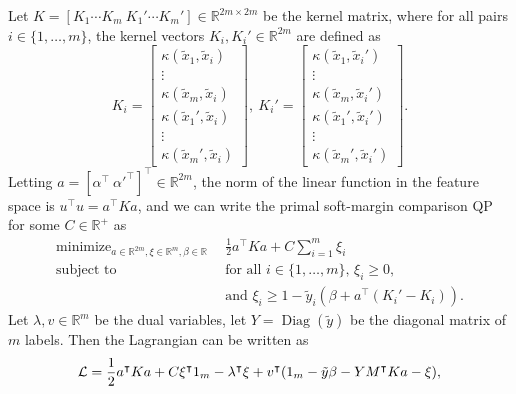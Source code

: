 \documentclass{article}
\newcommand{\RR}{\mathbb R}
\DeclareMathOperator*{\Diag}{Diag}
\DeclareMathOperator*{\minimize}{minimize}
\begin{document}
Let $K=[K_1\cdots K_m\ K_1'\cdots K_m']\in\RR^{2m\times 2m}$ be the
kernel matrix, where for all pairs $i\in\{1, \dots, m\}$, the kernel
vectors $K_i,K_i'\in\RR^{2m}$ are defined as
\begin{equation}
  K_i = \left[
    \begin{array}{c}
      \kappa(\tilde x_1, \tilde x_i)\\
      \vdots\\
      \kappa(\tilde x_m, \tilde x_i)\\
      \kappa(\tilde x_1', \tilde x_i)\\
      \vdots\\
      \kappa(\tilde x_m', \tilde x_i)
    \end{array}
  \right],\ 
  K_i' = \left[
    \begin{array}{c}
      \kappa(\tilde x_1, \tilde x_i')\\
      \vdots\\
      \kappa(\tilde x_m, \tilde x_i')\\
      \kappa(\tilde x_1', \tilde x_i')\\
      \vdots\\
      \kappa(\tilde x_m', \tilde x_i')
    \end{array}
  \right].
\end{equation}
Letting $a=[\alpha^\intercal\
\alpha'^\intercal]^\intercal\in\RR^{2m}$, the norm of the linear
function in the feature space is $u^\intercal u = a^\intercal K a$,
and we can write the primal soft-margin comparison QP for some
$C\in\RR^+$ as
\begin{equation}
  \begin{aligned}
      \minimize_{a\in\RR^{2m},\xi\in\RR^m,\beta\in\RR}\ \ & 
      \frac 1 2 a^\intercal K a + C\sum_{i=1}^m \xi_i \\
      \text{subject to}\ \ & 
      \text{for all $i\in\{1,\dots,m\}$, }
      \xi_i \geq 0,\\
      &\text{and }
      \xi_i \geq 1-\tilde y_i(\beta + a^\intercal (K_i'-K_i)).
  \end{aligned}
\end{equation}
Let $\lambda, v\in\RR^m$ be the dual variables, let $Y=\Diag(\tilde
y)$ be the diagonal matrix of $m$ labels. Then the Lagrangian can be
written as
\begin{equation}
  \label{eq:lagrangian}
  \mathcal L = \frac 1 2 a^\intercal K a + C\xi^\intercal 1_{m}\\
  -\lambda^\intercal \xi + v^\intercal(1_m - \tilde y\beta - Y M^\intercal K a - \xi),
\end{equation}
\end{document}
